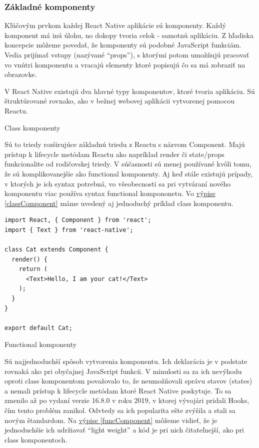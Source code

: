 \subsubsection{Základné komponenty}
Kľúčovým prvkom každej React Native aplikácie sú komponenty. Každý komponent má inú úlohu, no dokopy tvoria celok - samotnú aplikáciu. Z hľadiska koncepcie môžeme povedať, že komponenty sú podobné JavaScript funkciám. Vedia prijímať vstupy (nazývané ``props''), s ktorými potom umožňujú pracovať vo vnútri komponentu a vracajú elementy ktoré popisujú čo sa má zobraziť na obrazovke. \cite{react}

V React Native existujú dva hlavné typy komponentov, ktoré tvoria aplikáciu. Sú štruktúrované rovnako, ako v bežnej webovej aplikácii vytvorenej pomocou Reactu.
\begin{itemize}[leftmargin=*]
{\bf \item Class komponenty} \newline
Sú to triedy rozširujúce základnú triedu z Reactu s názvom Component. Majú prístup k lifecycle metódam Reactu ako napríklad render či state/props funkcionalite od rodičovskej triedy. V súčasnosti sú menej používané kvôli tomu, že sú komplikovanejšie ako functional komponenty. Aj keď stále existujú prípady, v ktorých je ich syntax potrebná, vo všeobecnosti sa pri vytváraní nového komponentu viac používa syntax functional kompononetu. Vo \hyperref[classComponent]{výpise \ref{classComponent}} máme uvedený aj jednoduchý príklad class komponentu.  \\

\begin{lstlisting}[caption={Príklad class komponentu}, label={classComponent}]
import React, { Component } from 'react';
import { Text } from 'react-native';

class Cat extends Component {
  render() {
    return (
      <Text>Hello, I am your cat!</Text>
    );
  }
}

export default Cat;
\end{lstlisting}
{\bf \item Functional komponenty} \newline
Sú najjednoduchší spôsob vytvorenia komponentu. Ich deklarácia je v podstate rovnaká ako pri obyčajnej JavaScript funkcii. V minulosti sa za ich nevýhodu oproti class komponentom považovalo to, že neumožňovali správu stavov (states) a nemali prístup k lifecycle metódam ktoré React Native poskytuje. To sa zmenilo až po vydaní verzie 16.8.0 v roku 2019, v ktorej vývojári pridali Hooks, čím tento problém zanikol. \cite{hooks} Odvtedy sa ich popularita ešte zvýšila a stali sa novým štandardom. Na \hyperref[funcComponent]{výpise \ref{funcComponent}} môžeme vidieť, že je jednoduchšie ich udržiavať ``light weight'' a kód je pri nich čitateľnejší, ako pri class komponentoch. \\


\end{itemize}
